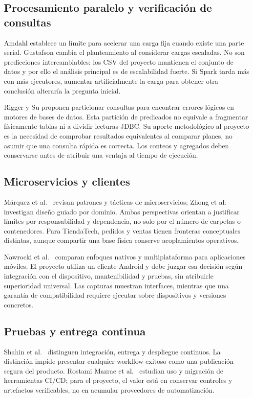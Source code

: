\documentclass[12pt,a4paper]{article}
\begin{document}


\subsection{Procesamiento paralelo y verificación de consultas}
Amdahl \cite{amdahl1967validity} establece un límite para acelerar una carga fija cuando existe una parte serial. Gustafson \cite{gustafson1988reevaluating} cambia el planteamiento al considerar cargas escaladas. No son predicciones intercambiables: los CSV del proyecto mantienen el conjunto de datos y por ello el análisis principal es de escalabilidad fuerte. Si Spark tarda más con más ejecutores, aumentar artificialmente la carga para obtener otra conclusión alteraría la pregunta inicial.

Rigger y Su \cite{rigger2020querypartitioning} proponen particionar consultas para encontrar errores lógicos en motores de bases de datos. Esta partición de predicados no equivale a fragmentar físicamente tablas ni a dividir lecturas JDBC. Su aporte metodológico al proyecto es la necesidad de comprobar resultados equivalentes al comparar planes, no asumir que una consulta rápida es correcta. Los conteos y agregados deben conservarse antes de atribuir una ventaja al tiempo de ejecución.

\subsection{Microservicios y clientes}
Márquez et al.\ \cite{marquez2018review} revisan patrones y tácticas de microservicios; Zhong et al.\ \cite{zhong2024domaindriven} investigan diseño guiado por dominio. Ambas perspectivas orientan a justificar límites por responsabilidad y dependencia, no solo por el número de carpetas o contenedores. Para TiendaTech, pedidos y ventas tienen fronteras conceptuales distintas, aunque compartir una base física conserve acoplamientos operativos.

Nawrocki et al.\ \cite{nawrocki2021comparison} comparan enfoques nativos y multiplataforma para aplicaciones móviles. El proyecto utiliza un cliente Android y debe juzgar esa decisión según integración con el dispositivo, mantenibilidad y pruebas, sin atribuirle superioridad universal. Las capturas muestran interfaces, mientras que una garantía de compatibilidad requiere ejecutar sobre dispositivos y versiones concretos.

\subsection{Pruebas y entrega continua}
Shahin et al.\ \cite{shahin2017continuous} distinguen integración, entrega y despliegue continuos. La distinción impide presentar cualquier workflow exitoso como una publicación segura del producto. Rostami Mazrae et al.\ \cite{rostami2023cicd} estudian uso y migración de herramientas CI/CD; para el proyecto, el valor está en conservar controles y artefactos verificables, no en acumular proveedores de automatización.
\end{document}
